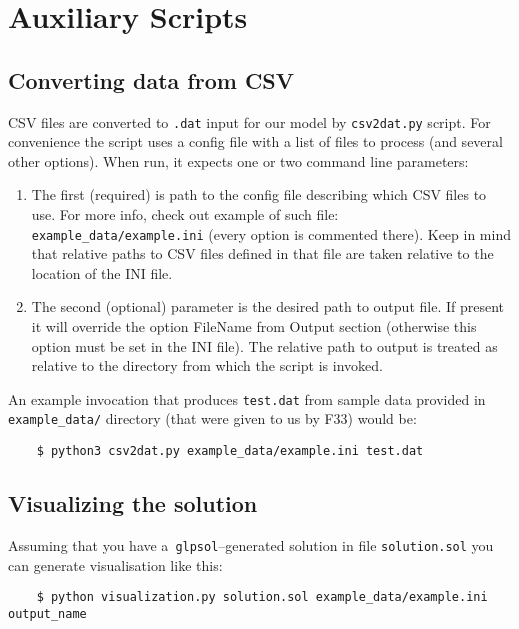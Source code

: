 \section{Auxiliary Scripts}

\subsection{Converting data from CSV}

CSV files are converted to \texttt{.dat} input for our model by \texttt{csv2dat.py} script. For convenience the script uses a config file with a list of files to process (and several other options). When run, it expects one or two command line parameters:

\begin{enumerate}
    \item The first (required) is path to the config file describing which CSV files to use. For more info, check out example of such file: \texttt{example\_data/example.ini} (every option is commented there). Keep in mind that relative paths to CSV files defined in that file are taken relative to the location of the INI file.
    \item The second (optional) parameter is the desired path to output file. If present it will override the option FileName from Output section (otherwise this option must be set in the INI file). The relative path to output is treated as relative to the directory from which the script is invoked.
\end{enumerate}

An example invocation that produces \texttt{test.dat} from sample data provided in \texttt{example\_data/} directory (that were given to us by F33) would be:

\begin{verbatim}
    $ python3 csv2dat.py example_data/example.ini test.dat
\end{verbatim}


\subsection{Visualizing the solution}

Assuming that you have a~\texttt{glpsol}--generated solution in file \texttt{solution.sol} you can generate visualisation like this:

\begin{verbatim}
    $ python visualization.py solution.sol example_data/example.ini output_name
\end{verbatim}


